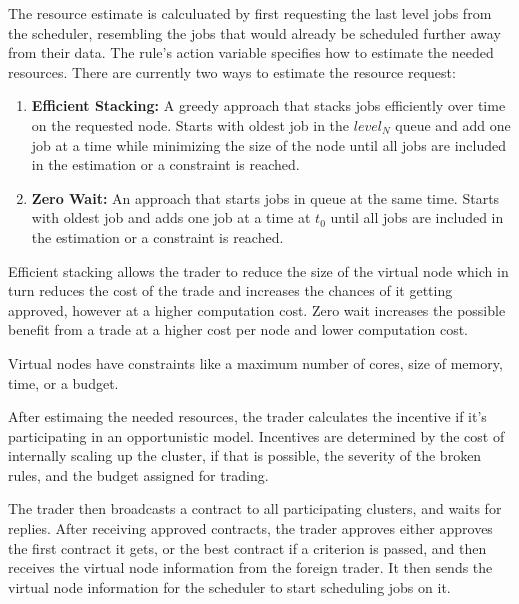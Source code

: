 
The resource estimate is calculuated by first requesting the last level jobs
from the scheduler, resembling the jobs that would already be scheduled further
away from their data. The rule's action variable specifies how to estimate the
needed resources. There are currently two ways to estimate the resource
request:

\begin{enumerate}

  \item \textbf{Efficient Stacking:} A greedy approach that stacks jobs
    efficiently over time on the requested node. Starts with oldest job in the
    $level_N$ queue and add one job at a time while minimizing the size of the
    node until all jobs are included in the estimation or a constraint is
    reached.

  \item \textbf{Zero Wait:} An approach that starts jobs in queue at the same
    time. Starts with oldest job and adds one job at a time at $t_0$ until all
    jobs are included in the estimation or a constraint is reached.

\end{enumerate}

Efficient stacking allows the trader to reduce the size of the virtual node
which in turn reduces the cost of the trade and increases the chances of it
getting approved, however at a higher computation cost. Zero wait increases the
possible benefit from a trade at a higher cost per node and lower computation
cost.  

Virtual nodes have constraints like a maximum number of cores,
size of memory, time, or a budget. 


After estimaing the needed resources, the trader calculates the incentive if
it's participating in an opportunistic model. Incentives are determined by the
cost of internally scaling up the cluster, if that is possible, the
severity of the broken rules, and the budget assigned for trading.

The trader then broadcasts a contract to all participating clusters, and waits
for replies. After receiving approved contracts, the trader approves either
approves the first contract it gets, or the best contract if a criterion is
passed, and then receives the virtual node information from the foreign trader.
It then sends the virtual node information for the scheduler to start
scheduling jobs on it.


